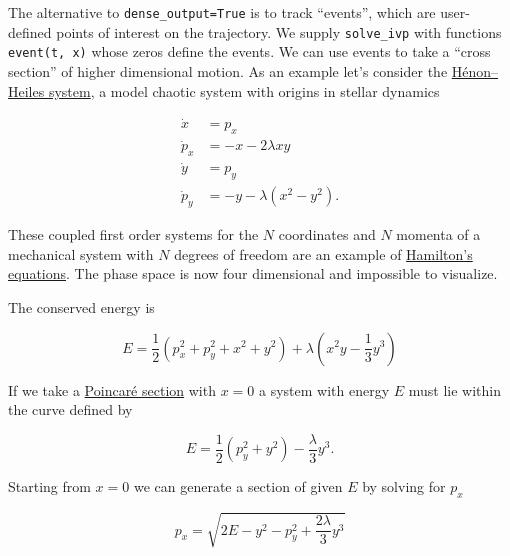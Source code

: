 \documentclass[
  letterpaper,
  DIV=11,
  numbers=noendperiod]{scrreprt}
\theoremstyle{definition}
\theoremstyle{remark}
\begin{document}
The alternative to \texttt{dense\_output=True} is to track ``events'',
which are user-defined points of interest on the trajectory. We supply
\texttt{solve\_ivp} with functions \texttt{event(t,\ x)} whose zeros
define the events. We can use events to take a ``cross section'' of
higher dimensional motion. As an example let's consider the
\href{https://en.wikipedia.org/wiki/H\%C3\%A9non\%E2\%80\%93Heiles_system}{Hénon--Heiles
system}, a model chaotic system with origins in stellar dynamics

\[
\begin{align}
\dot x &= p_x \\
\dot p_x &= -x -2\lambda xy \\
\dot y &= p_y \\
\dot p_y &=  - y -\lambda(x^2-y^2).
\end{align}
\]

These coupled first order systems for the \(N\) coordinates and \(N\)
momenta of a mechanical system with \(N\) degrees of freedom are an
example of
\href{https://en.wikipedia.org/wiki/Hamiltonian_mechanics}{Hamilton's
equations}. The phase space is now four dimensional and impossible to
visualize.

The conserved energy is

\[
E = \frac{1}{2}\left(p_x^2+p_y^2 + x^2 + y^2\right) + \lambda\left(x^2y-\frac{1}{3}y^3\right)
\]

If we take a
\href{https://en.wikipedia.org/wiki/Poincar\%C3\%A9_map}{Poincaré
section} with \(x=0\) a system with energy \(E\) must lie within the
curve defined by

\[
E = \frac{1}{2}\left(p_y^2 + y^2\right) -\frac{\lambda}{3}y^3.
\]

Starting from \(x=0\) we can generate a section of given \(E\) by
solving for \(p_x\)

\[
p_x = \sqrt{2E-y^2-p_y^2 + \frac{2\lambda}{3}y^3}
\]
\end{document}
